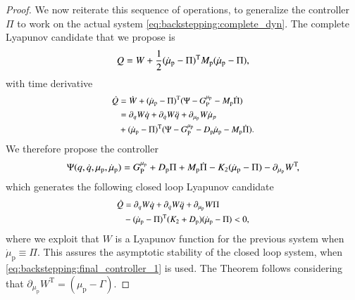 \begin{proof}
	We now reiterate this sequence of operations, to generalize the controller $\Pi$ to work on the actual system \eqref{eq:backstepping:complete_dyn}.
	The complete Lyapunov candidate that we propose is
	\begin{equation}\small
		Q = W + \frac{1}{2}(\dot{\mu}_\mathrm{p} - \Pi)^{\mathrm{T}} M_\mathrm{p} (\dot{\mu}_\mathrm{p} - \Pi),
	\end{equation}
	with time derivative
	\begin{equation*}\small
		\begin{split}
			\dot{Q} &= \dot{W} + (\dot{\mu}_\mathrm{p} - \Pi)^{\mathrm{T}} (\Psi - G_{\mathrm{P}}^{\mu_\mathrm{p}} - M_\mathrm{p} \dot{\Pi}) \\
			 &= \partial_{q} W \dot{q} + \partial_{\dot{q}} W \ddot{q} + \partial_{\mu_\mathrm{p}} W \dot{\mu}_p\\
			 & + (\dot{\mu}_\mathrm{p} - \Pi)^{\mathrm{T}} (\Psi - G_{\mathrm{P}}^{\mu_\mathrm{p}} - D_\mathrm{p} \dot{\mu}_\mathrm{p} - M_\mathrm{p} \dot{\Pi}) .
		\end{split}
	\end{equation*}
	We therefore propose the controller
	\begin{equation}\small\label{eq:backstepping:final_controller_1}
	    \Psi(q, \dot{q}, \mu_\mathrm{p}, \dot{\mu}_\mathrm{p}) = G_{\mathrm{P}}^{\mu_\mathrm{p}} + D_\mathrm{p} \Pi + M_\mathrm{p} \dot{\Pi} - K_2 (\dot{\mu}_\mathrm{p} - \Pi) 
	    - \partial_{\mu_\mathrm{p}} W^{\mathrm{T}}\!,
	\end{equation}
	which generates the following closed loop Lyapunov candidate
	\begin{equation}\small
	    \begin{split}
			\dot{Q} &= \partial_{q} W \dot{q} + \partial_{\dot{q}} W \ddot{q} + \partial_{\mu_\mathrm{p}} W \Pi \\
			&- (\dot{\mu}_\mathrm{p} - \Pi)^{\mathrm{T}} (K_2 + D_\mathrm{p}) (\dot{\mu}_\mathrm{p} - \Pi)
			< 0,
	    \end{split}
	\end{equation}
	where we exploit that $W$ is a Lyapunov function for the previous system when $\dot{\mu}_\mathrm{p} \equiv \Pi$. This assures the asymptotic stability of the closed loop system, when \eqref{eq:backstepping:final_controller_1} is used. The Theorem follows considering that $\partial_{\mu_\mathrm{p}} W^{\mathrm{T}} = (\mu_\mathrm{p} - \Gamma)$.
	

\end{proof}
